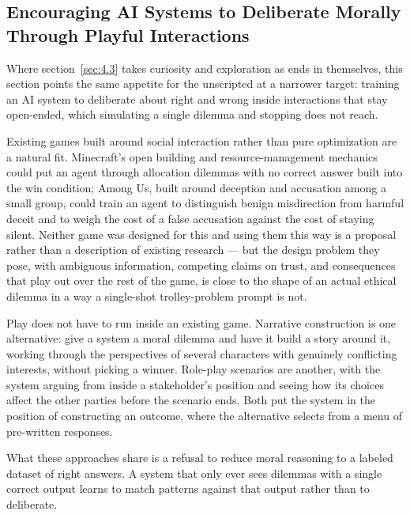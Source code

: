 \subsection{Encouraging AI Systems to Deliberate Morally Through Playful Interactions}
\label{sec:5.7.2}
Where section~\ref{sec:4.3} takes curiosity and exploration as ends in themselves, this section points the same appetite for the unscripted at a narrower target: training an AI system to deliberate about right and wrong inside interactions that stay open-ended, which simulating a single dilemma and stopping does not reach.

Existing games built around social interaction rather than pure optimization are a natural fit. Minecraft's open building and resource-management mechanics could put an agent through allocation dilemmas with no correct answer built into the win condition; Among Us, built around deception and accusation among a small group, could train an agent to distinguish benign misdirection from harmful deceit and to weigh the cost of a false accusation against the cost of staying silent. Neither game was designed for this and using them this way is a proposal rather than a description of existing research — but the design problem they pose, with ambiguous information, competing claims on trust, and consequences that play out over the rest of the game, is close to the shape of an actual ethical dilemma in a way a single-shot trolley-problem prompt is not.

Play does not have to run inside an existing game. Narrative construction is one alternative: give a system a moral dilemma and have it build a story around it, working through the perspectives of several characters with genuinely conflicting interests, without picking a winner. Role-play scenarios are another, with the system arguing from inside a stakeholder's position and seeing how its choices affect the other parties before the scenario ends. Both put the system in the position of constructing an outcome, where the alternative selects from a menu of pre-written responses.

What these approaches share is a refusal to reduce moral reasoning to a labeled dataset of right answers. A system that only ever sees dilemmas with a single correct output learns to match patterns against that output rather than to deliberate.
